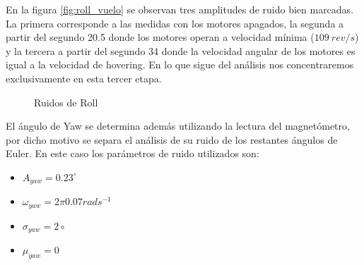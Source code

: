 \documentclass[main]{subfiles}
\begin{document}
En la figura \ref{fig:roll_vuelo} se observan tres amplitudes de ruido bien marcadas. La primera corresponde a las medidas con los motores apagados, la segunda a partir del segundo 20.5 donde los motores operan a velocidad m\'inima ($109 \: rev/s$) y la tercera a partir del segundo 34 donde la velocidad angular de los motores es igual a la velocidad de hovering. En lo que sigue del an\'alisis nos concentraremos exclusivamente en esta tercer etapa.\\

\begin{figure}[h!]
  \centering
  \caption{Ruidos de Roll}
  \label{fig:ruidos_roll}
\end{figure}
  
El \'angulo de Yaw se determina adem\'as utilizando la lectura del magnet\'ometro, por dicho motivo se separa el an\'alisis de su ruido de los restantes \'angulos de Euler. En este caso los par\'ametros de ruido utilizados son:

\begin{itemize}
\item $A_{yaw} = 0.23^\circ$
\item $\omega_{yaw} = 2\pi 0.07 rad s^{-1}$
\item $\sigma_{yaw} = 2\circ$
\item $\mu_{yaw} = 0$
\end{itemize}
\end{document}
